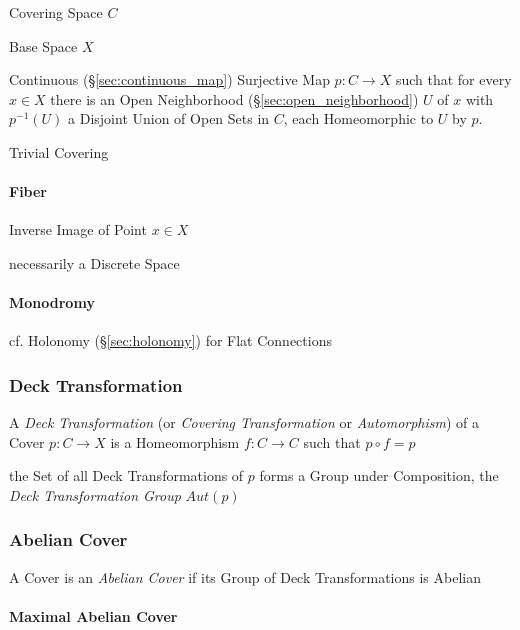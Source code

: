 Covering Space $C$

Base Space $X$

Continuous (\S\ref{sec:continuous_map}) Surjective Map $p : C
\rightarrow X$ such that for every $x \in X$ there is an Open
Neighborhood (\S\ref{sec:open_neighborhood}) $U$ of $x$ with
$p^{-1}(U)$ a Disjoint Union of Open Sets in $C$, each Homeomorphic to
$U$ by $p$.

Trivial Covering



\paragraph{Fiber}\label{sec:point_fiber}\hfill

Inverse Image of Point $x \in X$

necessarily a Discrete Space



\paragraph{Monodromy}\label{sec:monodromy}\hfill

\fist cf. Holonomy (\S\ref{sec:holonomy}) for Flat Connections



\subsubsection{Deck Transformation}\label{sec:deck_transformation}

A \emph{Deck Transformation} (or \emph{Covering Transformation} or
\emph{Automorphism}) of a Cover $p : C \rightarrow X$ is a
Homeomorphism $f : C \rightarrow C$ such that $p \circ f = p$

the Set of all Deck Transformations of $p$ forms a Group under
Composition, the \emph{Deck Transformation Group} $Aut(p)$



\subsubsection{Abelian Cover}\label{sec:abelian_cover}

A Cover is an \emph{Abelian Cover} if its Group of Deck
Transformations is Abelian



\paragraph{Maximal Abelian Cover}\label{sec:maximal_abelian_cover}\hfill

